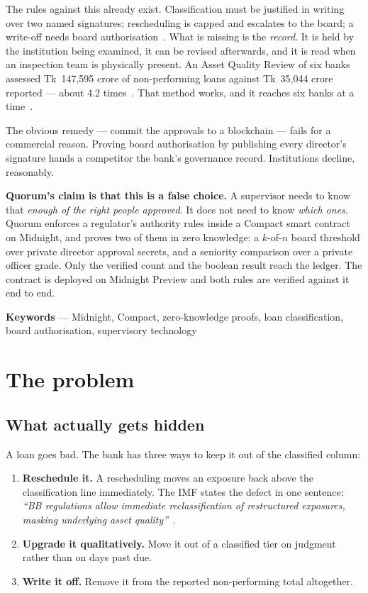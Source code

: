 \documentclass[11pt,a4paper]{article}
\begin{document}
The rules against this already exist. Classification must be justified in writing over two named
signatures; rescheduling is capped and escalates to the board; a write-off needs board
authorisation~\cite{brpd15,prudential}. What is missing is the \emph{record}. It is held by the
institution being examined, it can be revised afterwards, and it is read when an inspection team is
physically present. An Asset Quality Review of six banks assessed Tk~147,595 crore of non-performing
loans against Tk~35,044 crore reported --- about 4.2 times~\cite{aqr}. That method works, and it reaches
six banks at a time~\cite{aqr11}.

The obvious remedy --- commit the approvals to a blockchain --- fails for a commercial reason. Proving
board authorisation by publishing every director's signature hands a competitor the bank's governance
record. Institutions decline, reasonably.

\textbf{Quorum's claim is that this is a false choice.} A supervisor needs to know that \emph{enough of
the right people approved}. It does not need to know \emph{which ones}. Quorum enforces a regulator's
authority rules inside a Compact smart contract on Midnight, and proves two of them in zero knowledge: a
$k$-of-$n$ board threshold over private director approval secrets, and a seniority comparison over a
private officer grade. Only the verified count and the boolean result reach the ledger. The contract is
deployed on Midnight Preview and both rules are verified against it end to end.

{\small\textbf{Keywords} --- Midnight, Compact, zero-knowledge proofs, loan classification, board
authorisation, supervisory technology}

\section{The problem}

\subsection{What actually gets hidden}

A loan goes bad. The bank has three ways to keep it out of the classified column:

\begin{enumerate}
  \item \textbf{Reschedule it.} A rescheduling moves an exposure back above the classification line
    immediately. The IMF states the defect in one sentence: \emph{``BB regulations allow immediate
    reclassification of restructured exposures, masking underlying asset quality''}~\cite{imf}.
  \item \textbf{Upgrade it qualitatively.} Move it out of a classified tier on judgment rather than on
    days past due.
  \item \textbf{Write it off.} Remove it from the reported non-performing total altogether.
\end{enumerate}
\end{document}
